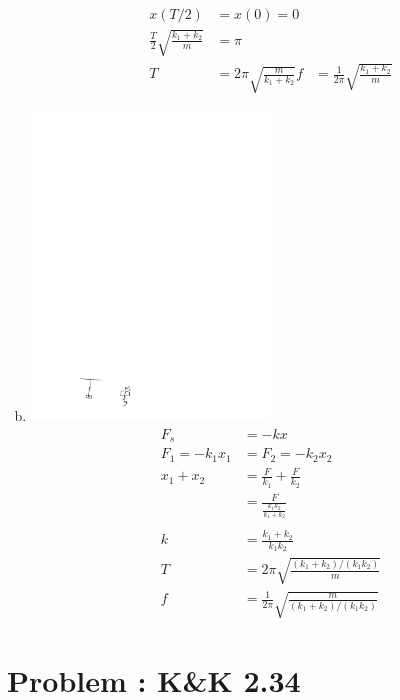 \documentclass[solutions]{esg8012pset}
\begin{document}
\begin{enumerate}[a)]
\begin{align*}
      \\
      x(T/2) & = x(0) = 0 \\
      \frac{T}{2}\sqrt{\frac{k_1 + k_2}{m}} & = \pi \\
      T & = 2\pi\sqrt{\frac{m}{k_1 + k_2}}
      f & = \frac{1}{2\pi}\sqrt{\frac{k_1 + k_2}{m}}
    \end{align*}
    \item \includegraphics[width=0.5\textwidth]{2009-10-02_Diagram_5_2}\begin{align*}
     F_s & = -kx \\
     F_1 = -k_1 x_1 & = F_2 = -k_2 x_2 \\
     x_1 + x_2 & = \frac{F}{k_1} + \frac{F}{k_2} \\
     & = \frac{F}{\frac{k_1 k_2}{k_1 + k_2}} \\
     \\
     k & = \frac{k_1 + k_2}{k_1 k_2} \\
     T & = 2\pi\sqrt{\frac{(k_1+k_2)/(k_1 k_2)}{m}} \\
     f & = \frac{1}{2\pi}\sqrt{\frac{m}{(k_1+k_2)/(k_1 k_2)}}
   \end{align*}
  \end{enumerate}
\section{Problem \thesection: K\&K 2.34}
\end{document}
